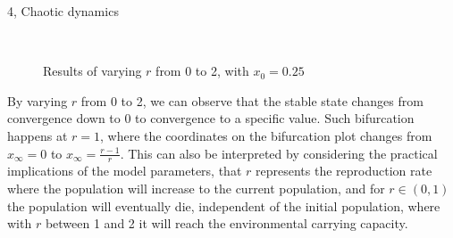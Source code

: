 \documentclass[10pt,a4paper]{article}
\begin{document}
\begin{task}{4, Chaotic dynamics}
\begin{figure} [H]
    \centering
    \\
    \caption{Results of varying $r$ from 0 to 2, with $x_0=0.25$}
    \label{fig:task4-1-1}
\end{figure}

By varying $r$ from 0 to 2, we can observe that the stable state changes from convergence down to 0 to convergence to a specific value. Such bifurcation happens at $r=1$,  where the coordinates on the bifurcation plot changes from $x_\infty=0$ to $x_\infty=\frac{r-1}{r}$. This can also be interpreted by considering the practical implications of the model parameters, that $r$ represents the reproduction rate where the population will increase to the current population, and for $r\in (0,1)$ the population will eventually die, independent of the initial population, where with $r$ between 1 and 2 it will reach the environmental carrying capacity.


\end{task}
\end{document}
